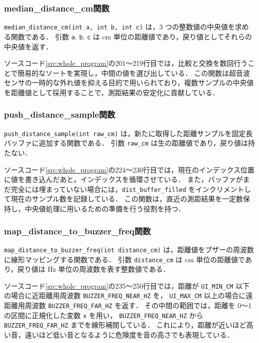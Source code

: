 \documentclass[a4paper,fontsize=11pt,line_length=40zw,number_of_lines=35,baselineskip=1.7zw]{jlreq}
\begin{document}
\subsubsection{median\_distance\_cm関数}

\lstinline|median_distance_cm(int a, int b, int c)| は，3 つの整数値の中央値を求める関数である．
引数 \lstinline|a|, \lstinline|b|, \lstinline|c| は cm 単位の距離値であり，戻り値としてそれらの中央値を返す．

ソースコード\ref{src:whole_program}の201〜219行目では，比較と交換を数回行うことで簡易的なソートを実現し，中間の値を選び出している．
この関数は超音波センサの一時的な外れ値を抑える目的で用いられており，複数サンプルの中央値を距離値として採用することで，測距結果の安定化に貢献している．

\subsubsection{push\_distance\_sample関数}

\lstinline|push_distance_sample(int raw_cm)| は，新たに取得した距離サンプルを固定長バッファに追加する関数である．
引数 \lstinline|raw_cm| は生の距離値であり，戻り値は持たない．

ソースコード\ref{src:whole_program}の224〜230行目では，現在のインデックス位置に値を書き込んだあと，インデックスを循環させている．
また，バッファがまだ完全には埋まっていない場合には，\lstinline|dist_buffer_filled| をインクリメントして現在のサンプル数を記録している．
この関数は，直近の測距結果を一定数保持し，中央値処理に用いるための準備を行う役割を持つ．

\subsubsection{map\_distance\_to\_buzzer\_freq関数}

\lstinline|map_distance_to_buzzer_freq(int distance_cm)| は，距離値をブザーの周波数に線形マッピングする関数である．
引数 \lstinline|distance_cm| は cm 単位の距離値であり，戻り値は Hz 単位の周波数を表す整数値である．

ソースコード\ref{src:whole_program}の235〜250行目では，距離が \lstinline|UI_MIN_CM| 以下の場合に近距離用周波数 \lstinline|BUZZER_FREQ_NEAR_HZ| を，
\lstinline|UI_MAX_CM| 以上の場合に遠距離用周波数 \lstinline|BUZZER_FREQ_FAR_HZ| を返す．
その中間の範囲では，距離を 0〜1 の区間に正規化した変数 \lstinline|x| を用い，
\lstinline|BUZZER_FREQ_NEAR_HZ| から \lstinline|BUZZER_FREQ_FAR_HZ| までを線形補間している．
これにより，距離が近いほど高い音，遠いほど低い音となるように危険度を音の高さでも表現している．
\end{document}
